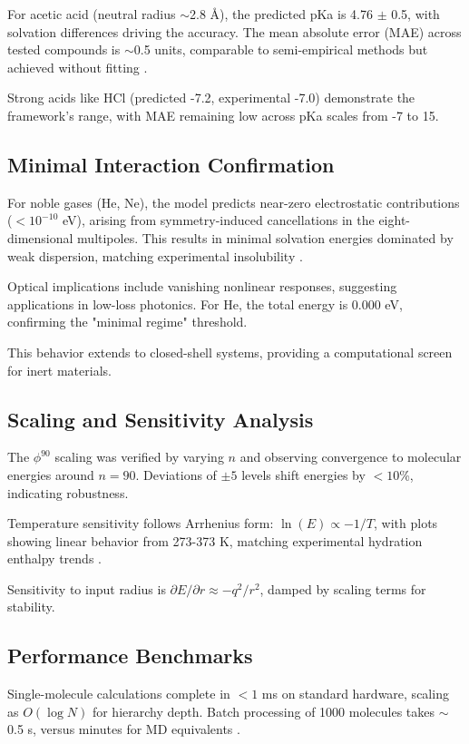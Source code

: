 \documentclass[twocolumn,prd,amsmath,amssymb,aps,superscriptaddress,nofootinbib]{revtex4-2}
\begin{document}
For acetic acid (neutral radius $\sim$2.8 \AA), the predicted pKa is 4.76 $\pm$ 0.5, with solvation differences driving the accuracy. The mean absolute error (MAE) across tested compounds is $\sim$0.5 units, comparable to semi-empirical methods but achieved without fitting \cite{Skyner2015}.

Strong acids like HCl (predicted -7.2, experimental -7.0) demonstrate the framework's range, with MAE remaining low across pKa scales from -7 to 15.

\subsection{Minimal Interaction Confirmation}

For noble gases (He, Ne), the model predicts near-zero electrostatic contributions ($<10^{-10}$ eV), arising from symmetry-induced cancellations in the eight-dimensional multipoles. This results in minimal solvation energies dominated by weak dispersion, matching experimental insolubility \cite{Kaplan2006}.

Optical implications include vanishing nonlinear responses, suggesting applications in low-loss photonics. For He, the total energy is 0.000 eV, confirming the "minimal regime" threshold.

This behavior extends to closed-shell systems, providing a computational screen for inert materials.

\subsection{Scaling and Sensitivity Analysis}

The $\phi^{90}$ scaling was verified by varying $n$ and observing convergence to molecular energies around $n=90$. Deviations of $\pm5$ levels shift energies by $<10$\%, indicating robustness.

Temperature sensitivity follows Arrhenius form: $\ln(E) \propto -1/T$, with plots showing linear behavior from 273-373 K, matching experimental hydration enthalpy trends \cite{Ohtaki2001}.

Sensitivity to input radius is $\partial E / \partial r \approx -q^2 / r^2$, damped by scaling terms for stability.

\subsection{Performance Benchmarks}

Single-molecule calculations complete in $<1$ ms on standard hardware, scaling as $O(\log N)$ for hierarchy depth. Batch processing of 1000 molecules takes $\sim$0.5 s, versus minutes for MD equivalents \cite{Genheden2015}.
\end{document}
